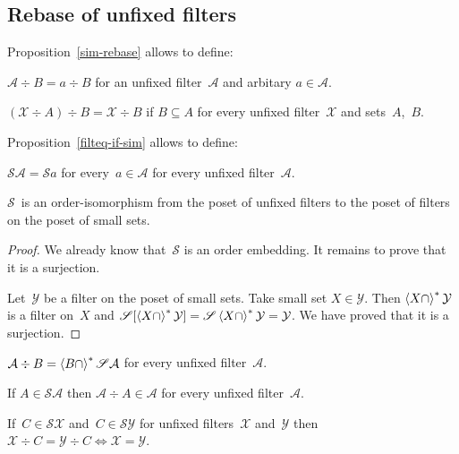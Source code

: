 \subsection{Rebase of unfixed filters}

Proposition~\ref{sim-rebase} allows to define:

\begin{defn}
$\mathcal{A}\div B = a\div B$ for an unfixed
filter~$\mathcal{A}$ and arbitary $a\in\mathcal{A}$.
\end{defn}

\begin{obvious}
$(\mathcal{X}\div A)\div B = \mathcal{X}\div B$ if
$B\subseteq A$ for every unfixed filter~$\mathcal{X}$ and
sets~$A$,~$B$.
\end{obvious}

Proposition~\ref{filteq-if-sim} allows to define:

\begin{defn}
$\mathscr{S}\mathcal{A} = \mathscr{S}a$ for
every~$a\in\mathcal{A}$ for every unfixed
filter~$\mathcal{A}$.
\end{defn}

\begin{thm}\label{mathscrs-iso}
$\mathscr{S}$~is an order-isomorphism from the poset of
unfixed filters to the poset of filters on the poset of
small sets.
\end{thm}

\begin{proof}
We already know that~$\mathscr{S}$ is an order embedding.
It remains to prove that it is a surjection.

Let~$\mathcal{Y}$ be a filter on the poset of small sets.
Take small set $X\in\mathcal{Y}$. Then
$\left\langle X\cap\right\rangle ^{\ast}\mathcal{Y}$ is a filter on~$X$ and
$\mathscr{S}[\left\langle X\cap\right\rangle ^{\ast}\mathcal{Y}]=\mathscr{S}\left\langle X\cap\right\rangle ^{\ast}\mathcal{Y}=\mathcal{Y}$. We have proved that
it is a surjection.
\end{proof}

\begin{obvious}
$\mathcal{A}\div B = \left\langle B\cap\right\rangle ^{\ast}\mathscr{S}\mathcal{A}$
for every unfixed filter~$\mathcal{A}$.
\end{obvious}

\begin{obvious}
If $A\in\mathscr{S}\mathcal{A}$ then
$\mathcal{A}\div A\in\mathcal{A}$ for every unfixed
filter~$\mathcal{A}$.
\end{obvious}

\begin{prop}
If~$C\in\mathscr{S}\mathcal{X}$
and~$C\in\mathscr{S}\mathcal{Y}$ for unfixed
filters~$\mathcal{X}$ and~$\mathcal{Y}$ then
$\mathcal{X}\div C=\mathcal{Y}\div C \Leftrightarrow
\mathcal{X}=\mathcal{Y}$.
\end{prop}

